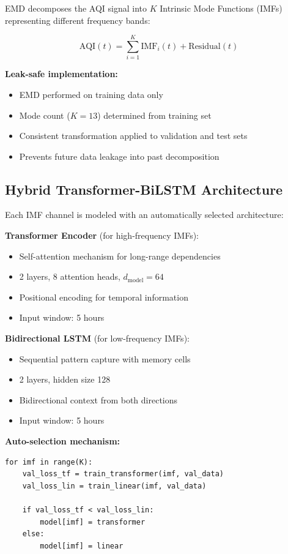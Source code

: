 \documentclass[11pt,a4paper]{article}
\begin{document}
EMD decomposes the AQI signal into $K$ Intrinsic Mode Functions (IMFs) representing different frequency bands:

\begin{equation}
\text{AQI}(t) = \sum_{i=1}^{K} \text{IMF}_i(t) + \text{Residual}(t)
\end{equation}

\textbf{Leak-safe implementation:}
\begin{itemize}
    \item EMD performed on training data only
    \item Mode count ($K=13$) determined from training set
    \item Consistent transformation applied to validation and test sets
    \item Prevents future data leakage into past decomposition
\end{itemize}

\subsection{Hybrid Transformer-BiLSTM Architecture}

Each IMF channel is modeled with an automatically selected architecture:

\textbf{Transformer Encoder} (for high-frequency IMFs):
\begin{itemize}
    \item Self-attention mechanism for long-range dependencies
    \item 2 layers, 8 attention heads, $d_{\text{model}}=64$
    \item Positional encoding for temporal information
    \item Input window: 5 hours
\end{itemize}

\textbf{Bidirectional LSTM} (for low-frequency IMFs):
\begin{itemize}
    \item Sequential pattern capture with memory cells
    \item 2 layers, hidden size 128
    \item Bidirectional context from both directions
    \item Input window: 5 hours
\end{itemize}

\textbf{Auto-selection mechanism:}
\begin{verbatim}
for imf in range(K):
    val_loss_tf = train_transformer(imf, val_data)
    val_loss_lin = train_linear(imf, val_data)
    
    if val_loss_tf < val_loss_lin:
        model[imf] = transformer
    else:
        model[imf] = linear
\end{verbatim}
\end{document}
